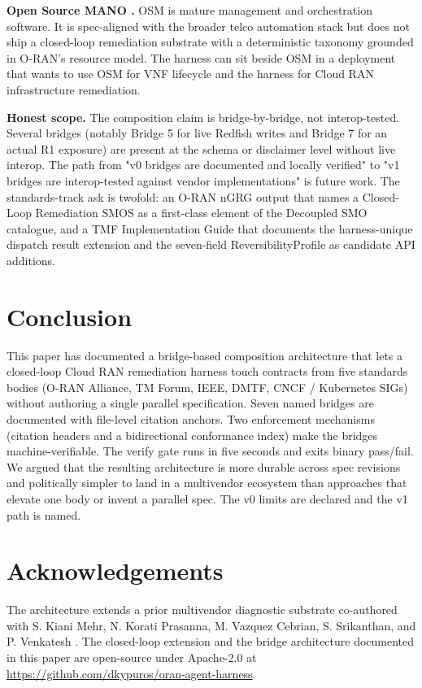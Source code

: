 \documentclass[twocolumn,10pt,a4paper]{article}
\begin{document}
\textbf{Open Source MANO \cite{osm}.} OSM is mature management and orchestration software. It is spec-aligned with the broader telco automation stack but does not ship a closed-loop remediation substrate with a deterministic taxonomy grounded in O-RAN's resource model. The harness can sit beside OSM in a deployment that wants to use OSM for VNF lifecycle and the harness for Cloud RAN infrastructure remediation.

\textbf{Honest scope.} The composition claim is bridge-by-bridge, not interop-tested. Several bridges (notably Bridge 5 for live Redfish writes and Bridge 7 for an actual R1 exposure) are present at the schema or disclaimer level without live interop. The path from "v0 bridges are documented and locally verified" to "v1 bridges are interop-tested against vendor implementations" is future work. The standards-track ask is twofold: an O-RAN nGRG output that names a Closed-Loop Remediation SMOS as a first-class element of the Decoupled SMO catalogue, and a TMF Implementation Guide that documents the harness-unique dispatch result extension and the seven-field ReversibilityProfile as candidate API additions.

\section{Conclusion}
\label{sec:conclude}

This paper has documented a bridge-based composition architecture that lets a closed-loop Cloud RAN remediation harness touch contracts from five standards bodies (O-RAN Alliance, TM Forum, IEEE, DMTF, CNCF / Kubernetes SIGs) without authoring a single parallel specification. Seven named bridges are documented with file-level citation anchors. Two enforcement mechanisms (citation headers and a bidirectional conformance index) make the bridges machine-verifiable. The verify gate runs in five seconds and exits binary pass/fail. We argued that the resulting architecture is more durable across spec revisions and politically simpler to land in a multivendor ecosystem than approaches that elevate one body or invent a parallel spec. The v0 limits are declared and the v1 path is named.

\section*{Acknowledgements}

The architecture extends a prior multivendor diagnostic substrate co-authored with S. Kiani Mehr, N. Korati Prasanna, M. Vazquez Cebrian, S. Srikanthan, and P. Venkatesh \cite{multivendor_blog_2026}. The closed-loop extension and the bridge architecture documented in this paper are open-source under Apache-2.0 at \url{https://github.com/dkypuros/oran-agent-harness}.



\end{document}
